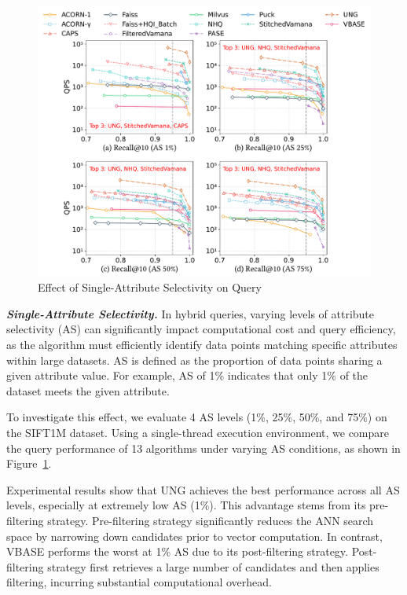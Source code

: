 \documentclass[sigconf, nonacm]{acmart}
\begin{document}
	\begin{figure}
		\centering
		\setlength{\abovecaptionskip}{0.1cm}
		\setlength{\belowcaptionskip}{-0.1cm}
		\includegraphics[width=\columnwidth]{figures/exp/exp_5_1_1_SingleLabel_1thread.pdf}
		\caption{Effect of Single-Attribute Selectivity on Query}
		\label{fig:exp_5_1_1_SingleLabel_1thread}
	\end{figure}
	
	
	\textit{\textbf{Single-Attribute Selectivity.}}
	In hybrid queries, varying levels of attribute selectivity (AS) can significantly impact computational cost and query efficiency, as the algorithm must efficiently identify data points matching specific attributes within large datasets. AS is defined as the proportion of data points sharing a given attribute value. For example, AS of 1\% indicates that only 1\% of the dataset meets the given attribute. 
	
	To investigate this effect, we evaluate 4 AS levels (1\%, 25\%, 50\%, and 75\%) on the SIFT1M dataset. Using a single-thread execution environment, we compare the query performance of 13 algorithms under varying AS conditions, as shown in Figure~\ref{fig:exp_5_1_1_SingleLabel_1thread}.
	
	Experimental results show that UNG achieves the best performance across all AS levels, especially at extremely low AS (1\%). 
	This advantage stems from its pre-filtering strategy. Pre-filtering strategy significantly reduces the ANN search space by narrowing down candidates prior to vector computation. In contrast, VBASE performs the worst at 1\% AS due to its post-filtering strategy. Post-filtering strategy first retrieves a large number of candidates and then applies filtering, incurring substantial computational overhead.
	
\end{document}

